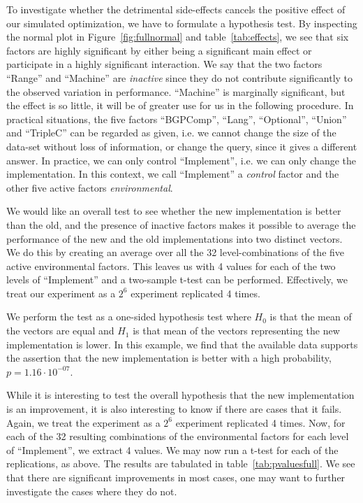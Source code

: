\documentclass{llncs}
\begin{document}
To investigate whether the detrimental side-effects cancels the
positive effect of our simulated optimization, we have to formulate a
hypothesis test. By inspecting the normal plot in
Figure~\ref{fig:fullnormal} and table~\ref{tab:effects}, we see that
six factors are highly significant by either being a significant main
effect or participate in a highly significant interaction. We say that
the two factors ``Range'' and ``Machine'' are \emph{inactive} since
they do not contribute significantly to the observed variation in
performance. ``Machine'' is marginally significant, but the effect is
so little, it will be of greater use for us in the following procedure. In
practical situations, the five factors ``BGPComp'', ``Lang'',
``Optional'', ``Union'' and ``TripleC'' can be regarded as given,
i.e. we cannot change the size of the data-set without loss of
information, or change the query, since it gives a different
answer. In practice, we can only control ``Implement'', i.e. we can
only change the implementation. In this context, we call ``Implement''
a \emph{control} factor and the other five active factors
\emph{environmental}.

We would like an overall test to see whether the new implementation is
better than the old, and the presence of inactive factors makes it
possible to average the performance of the new and the old
implementations into two distinct vectors. We do this by creating an
average over all the 32 level-combinations of the five active
environmental factors. This leaves us with 4 values for each of the
two levels of ``Implement'' and a two-sample t-test can be
performed. Effectively, we treat our experiment as a $2^6$ experiment
replicated 4 times.

We perform the test as a one-sided hypothesis test where $H_0$ is that
the mean of the vectors are equal and $H_1$ is that mean of the
vectors representing the new implementation is lower. In this example,
we find that the available data supports the assertion that the new
implementation is better with a high probability, $p=1.16 \cdot
10^{-07}$.

While it is interesting to test the overall hypothesis that the new
implementation is an improvement, it is also interesting to know if
there are cases that it fails. Again, we treat the experiment as a
$2^6$ experiment replicated 4 times. Now, for each of the 32 resulting
combinations of the environmental factors for each level of
``Implement'', we extract 4 values. We may now run a t-test for each
of the replications, as above. The results are tabulated in
table~\ref{tab:pvaluesfull}. We see that there are significant
improvements in most cases, one may want to further investigate the
cases where they do not.
\end{document}
